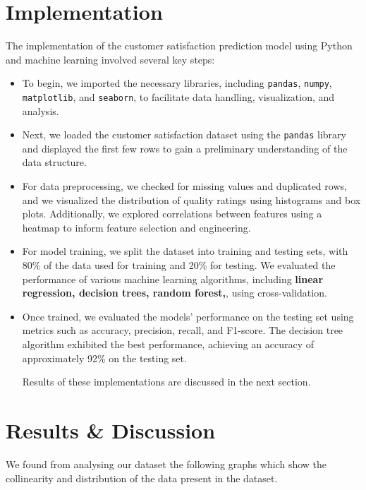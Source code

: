 \documentclass{article}
\begin{document}
\section{Implementation}

The implementation of the customer satisfaction prediction model using Python and machine learning involved several key steps:

\begin{itemize}
  \item To begin, we imported the necessary libraries, including \texttt{pandas}, \texttt{numpy}, \texttt{matplotlib}, and \texttt{seaborn}, to facilitate data handling, visualization, and analysis.
  
  \item Next, we loaded the customer satisfaction dataset using the \texttt{pandas} library and displayed the first few rows to gain a preliminary understanding of the data structure.
  
  \item For data preprocessing, we checked for missing values and duplicated rows, and we visualized the distribution of quality ratings using histograms and box plots. Additionally, we explored correlations between features using a heatmap to inform feature selection and engineering.
  
  
  \item For model training, we split the dataset into training and testing sets, with 80\% of the data used for training and 20\% for testing. We evaluated the performance of various machine learning algorithms, including \textbf{linear regression, decision trees, random forest,}, using cross-validation.
  
  \item Once trained, we evaluated the models' performance on the testing set using metrics such as accuracy, precision, recall, and F1-score. The decision tree algorithm exhibited the best performance, achieving an accuracy of approximately 92\% on the testing set.


  
  Results of these implementations are discussed in the next section.
\end{itemize}

\section{Results \& Discussion}
We found from analysing our dataset the following graphs which show the collinearity and distribution of the data present in the dataset.
\end{document}
